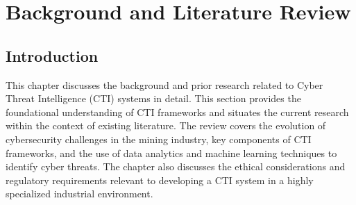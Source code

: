 \documentclass[a4paper,twoside,12pt]{report}
\begin{document}


\chapter{Background and Literature Review}

\section{Introduction}
This chapter discusses the background and prior research related to Cyber Threat Intelligence (CTI) systems in detail. This section provides the foundational understanding of CTI frameworks and situates the current research within the context of existing literature. The review covers the evolution of cybersecurity challenges in the mining industry, key components of CTI frameworks, and the use of data analytics and machine learning techniques to identify cyber threats. The chapter also discusses the ethical considerations and regulatory requirements relevant to developing a CTI system in a highly specialized industrial environment.
\end{document}
